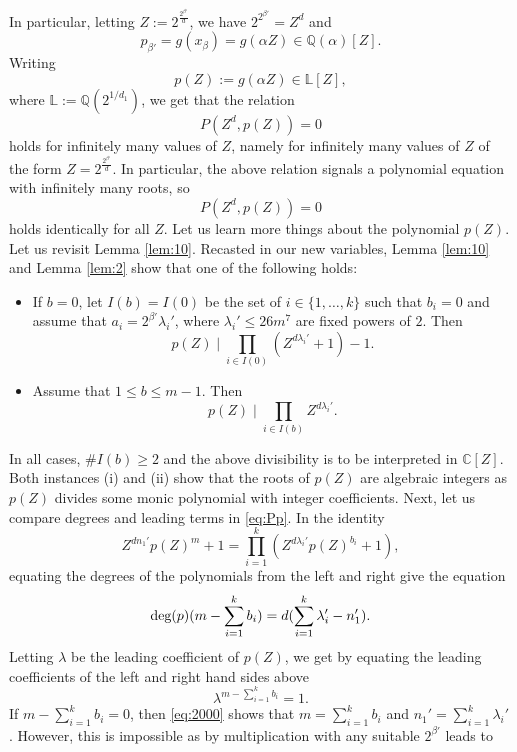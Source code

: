 \documentclass[11pt]{article}
\begin{document}
In particular, letting $Z:=2^{\frac{2^{\beta'}}{d}}$, we have $2^{2^{\beta'}}=Z^d$ and 
$$
p_{\beta'}=g(x_{\beta})=g(\alpha Z)\in {\mathbb Q}(\alpha)[Z].
$$ 
Writing 
$$
p(Z):=g(\alpha Z)\in {\mathbb L}[Z],
$$
where ${\mathbb L}:={\mathbb Q}(2^{1/d_1})$, we get that the relation 
\begin{equation}
\label{eq:112}
P(Z^d,p(Z))=0
\end{equation}
holds for infinitely many values of $Z$, namely for infinitely many values of $Z$ of the form $Z=2^{\frac{2^{\beta'}}{d}}$. In particular, the above relation signals a polynomial equation with infinitely many roots, so 
\begin{equation}
\label{eq:Pp}
P(Z^d,p(Z))=0
\end{equation}
holds identically for all $Z$. Let us learn more things about the polynomial $p(Z)$. Let us revisit Lemma \ref{lem:10}. Recasted in our new variables, Lemma \ref{lem:10} and Lemma \ref{lem:2} show that 
one of the following holds:
\begin{itemize}
\item[(i)] If $b=0$, let $I(b)=I(0)$ be the set of $i\in \{1,\ldots,k\}$ such that $b_i=0$ and assume that $a_i=2^{\beta'}\lambda_i'$, where $\lambda_i'\le 26m^7$ are fixed powers of $2$. Then
$$
p(Z)\mid \prod_{i\in I(0)} (Z^{d\lambda_i'}+1)-1.
$$
\item[(ii)] Assume that $1\le b\le m-1$. Then 
$$
p(Z)\mid \prod_{i\in I(b)} Z^{d\lambda_i'}.
$$
\end{itemize}
In all cases, $\#I(b)\ge 2$ and the above divisibility is to be interpreted in ${\mathbb C}[Z]$. Both instances (i) and (ii) show that the roots of $p(Z)$ are algebraic integers as $p(Z)$ divides some 
monic polynomial with integer coefficients. Next, let us compare degrees and leading terms in \eqref{eq:Pp}. 
In the identity 
$$
Z^{dn_1'}p(Z)^{m}+1=\prod_{i=1}^k (Z^{d\lambda_i'} p(Z)^{b_i}+1),
$$
equating the degrees of the polynomials from the left and right give the equation 
\begin{equation}
\label{eq:2000}
{\text{\rm deg}}(p)(m-\sum_{i=1}^{k} b_i)=d(\sum_{i=1}^k \lambda_i'-n_1').
\end{equation}
Letting $\lambda$ be the leading coefficient of $p(Z)$, we get by equating the leading coefficients of the left and right hand sides above 
\begin{equation}
\label{eq:2001}
\lambda^{m-\sum_{i=1}^k b_i}=1.
\end{equation}
If $m-\sum_{i=1}^k b_i=0$, then \eqref{eq:2000} shows that $m=\sum_{i=1}^k b_i$ and $n_1'=\sum_{i=1}^k \lambda_i'$. However, this is impossible as by multiplication with any suitable  $2^{\beta'}$ leads to
\end{document}
